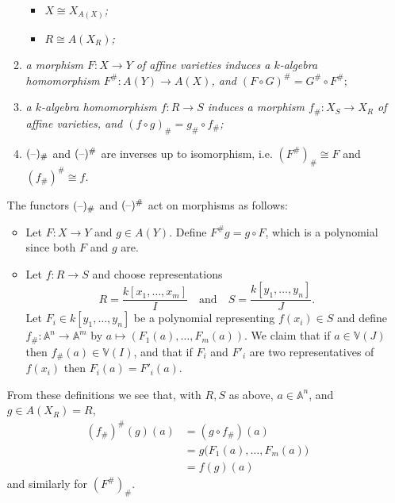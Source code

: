 \documentclass[10pt]{article}
\newcommand{\blank}{\hbox{--}}
\newcommand{\van}{\mathbb{V}}
\newcommand{\aff}{\mathbb{A}}
\begin{document}
\begin{itemize}
\begin{enumerate}
\begin{itemize}
                            \item $X\cong X_{A(X)}$\emph{;}
                            \item $R\cong A(X_R)$\emph{;}
                        \end{itemize}
                        \item \emph{a morphism $F\colon X\to Y$ of affine varieties induces a $k$-algebra homomorphism $F^\#\colon A(Y)\to A(X)$, and $(F\circ G)^\#=G^\#\circ F^\#;$}
                        \item \emph{a $k$-algebra homomorphism $f\colon R\to S$ induces a morphism $f_\#\colon X_S\to X_R$ of affine varieties, and $(f\circ g)_\#=g_\#\circ f_\#$;}
                        \item $(\blank)_\#$ and $(\blank)^\#$ are inverses up to isomorphism, i.e. $(F^\#)_\#\cong F$ and $(f_\#)^\#\cong f$.
                    \end{enumerate}

                    The functors $(\blank)_\#$ and $(\blank)^\#$ act on morphisms as follows:
                    \begin{itemize}
                        \item Let $F\colon X\to Y$ and $g\in A(Y)$.
                            Define $F^\#g=g\circ F$, which is a polynomial since both $F$ and $g$ are.
                        \item Let $f\colon R\to S$ and choose representations
                            \begin{equation*}
                                R=\frac{k[x_1,\ldots,x_m]}{I}\quad\text{and}\quad S=\frac{k[y_1,\ldots,y_n]}{J}.
                            \end{equation*}
                            Let $F_i\in k[y_1,\ldots,y_n]$ be a polynomial representing $f(x_i)\in S$ and define $f_\#\colon\aff^n\to\aff^m$ by $a\mapsto(F_1(a),\ldots,F_m(a))$.
                            We claim that if $a\in\van(J)$ then $f_\#(a)\in\van(I)$, and that if $F_i$ and $F'_i$ are two representatives of $f(x_i)$ then $F_i(a)=F'_i(a)$.
                    \end{itemize}
                    From these definitions we see that, with $R,S$ as above, $a\in\aff^n$, and $g\in A(X_R)=R$,
                    \begin{align*}
                        (f_\#)^\#(g)(a) &= (g\circ f_\#)(a)\\
                        &= g\big(F_1(a),\ldots,F_m(a)\big)\\
                        &= f(g)(a)
                    \end{align*}
                    and similarly for $(F^\#)_\#$.
            \end{itemize}
\end{document}
